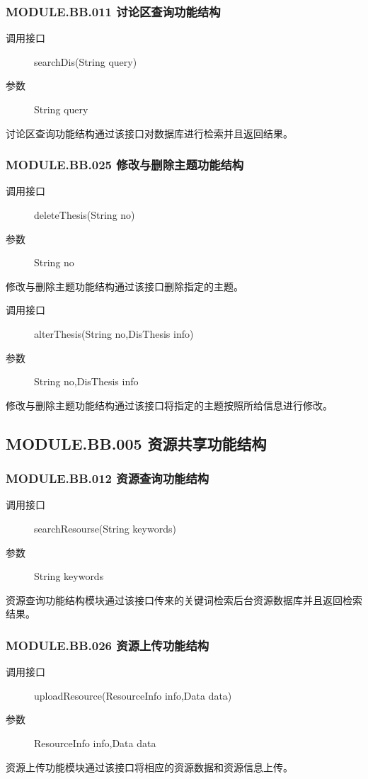   \subsubsection{MODULE.BB.011 讨论区查询功能结构}
  \begin{description}
    \item[调用接口]searchDis(String query)
    \item[参数]String query
  \end{description}
  讨论区查询功能结构通过该接口对数据库进行检索并且返回结果。
  \subsubsection{MODULE.BB.025 修改与删除主题功能结构}
  \begin{description}
    \item[调用接口]deleteThesis(String no)
    \item[参数]String no
  \end{description}
  修改与删除主题功能结构通过该接口删除指定的主题。
  \begin{description}
    \item[调用接口]alterThesis(String no,DisThesis info)
    \item[参数]String no,DisThesis info
  \end{description}
  修改与删除主题功能结构通过该接口将指定的主题按照所给信息进行修改。

\subsection{MODULE.BB.005 资源共享功能结构}
  \subsubsection{MODULE.BB.012 资源查询功能结构}
  \begin{description}
    \item[调用接口]searchResourse(String keywords)
    \item[参数]String keywords
  \end{description}
  资源查询功能结构模块通过该接口传来的关键词检索后台资源数据库并且返回检索结果。
  \subsubsection{MODULE.BB.026 资源上传功能结构}
  \begin{description}
    \item[调用接口]uploadResource(ResourceInfo info,Data data)
    \item[参数]ResourceInfo info,Data data
  \end{description}
  资源上传功能模块通过该接口将相应的资源数据和资源信息上传。
